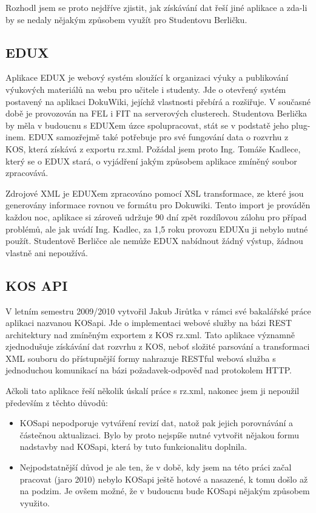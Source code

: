 \documentclass[11pt,twoside,a4paper]{book}
\begin{document}
Rozhodl jsem se proto nejdříve zjistit, jak získávání dat řeší jiné aplikace a zda-li by se nedaly nějakým způsobem využít pro Studentovu Berličku.

\subsection{EDUX}
Aplikace EDUX je webový systém sloužící k organizaci výuky a publikování výukových materiálů na webu pro učitele i studenty. Jde o otevřený systém postavený na aplikaci DokuWiki, jejíchž vlastnosti přebírá a rozšiřuje. V současné době je provozován na FEL i FIT na serverových clusterech. Studentova Berlička by měla v budoucnu s EDUXem úzce spolupracovat, stát se v podstatě jeho plug-inem. EDUX samozřejmě také potřebuje pro své fungování data o rozvrhu z KOS, která získává z exportu rz.xml. Požádal jsem proto Ing. Tomáše Kadlece, který se o EDUX stará, o vyjádření jakým způsobem aplikace zmíněný soubor zpracovává.

Zdrojové XML je EDUXem zpracováno pomocí XSL transformace, ze které jsou generovány informace rovnou ve formátu pro Dokuwiki. Tento import je prováděn každou noc, aplikace si zároveň udržuje 90 dní zpět rozdílovou zálohu pro případ problémů, ale jak uvádí Ing. Kadlec, za 1,5 roku provozu EDUXu ji nebylo nutné použít. Studentově Berličce ale nemůže EDUX nabídnout žádný výstup, žádnou  vlastně ani nepoužívá.

\subsection{KOS API}
V letním semestru 2009/2010 vytvořil Jakub Jirůtka v rámci své bakalářské práce\cite{jirutka} aplikaci nazvanou KOSapi. Jde o implementaci webové služby na bázi REST architektury nad zmíněným exportem z KOS rz.xml. Tato aplikace významně zjednodušuje získávání dat rozvrhu z KOS, neboť složité parsování a transformaci XML souboru do přístupnější formy nahrazuje RESTful webová služba s jednoduchou komunikací na bázi požadavek-odpověď nad protokolem HTTP.

Ačkoli tato aplikace řeší několik úskalí práce s rz.xml, nakonec jsem ji nepoužil především z těchto důvodů:
\begin{itemize}
\item KOSapi nepodporuje vytváření revizí dat, natož pak jejich porovnávání a částečnou aktualizaci. Bylo by proto nejspíše nutné vytvořit nějakou formu nadstavby nad KOSapi, která by tuto funkcionalitu doplnila.
\item Nejpodstatnější důvod je ale ten, že v době, kdy jsem na této práci začal pracovat (jaro 2010) nebylo KOSapi ještě hotové a nasazené, k tomu došlo až na podzim. Je ovšem možné, že v budoucnu bude KOSapi nějakým způsobem využito.
\end{itemize}
\end{document}
